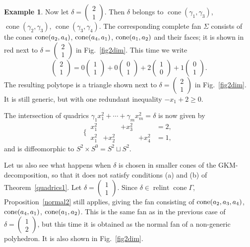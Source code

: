 \documentclass[a4paper]{amsart}
\theoremstyle{definition}
\newtheorem{example}[theorem]{Example}
\theoremstyle{remark}
\numberwithin{equation}{section}
\newcommand{\mb}[1]{{\textbf {\textit#1}}}
\renewcommand{\ge}{\geqslant}
\def\cone{\mathop{\mathrm{cone}}}
\def\relint{\mathop{\mathrm{relint}}}
\newcommand{\<}{\langle}
\renewcommand{\>}{\rangle}
\begin{document}
\begin{example}
Now let $\delta=\begin{pmatrix}2\\1\end{pmatrix}$. Then $\delta$ belongs to 
$\cone(\gamma_1,\gamma_3)$, $\cone(\gamma_2,\gamma_3)$, $\cone(\gamma_3,\gamma_4)$. The corresponding complete fan $\Sigma$ consists of the cones $\cone(\mb a_2,\mb a_4)$, $\cone(\mb a_4,\mb a_1)$, $\cone(\mb a_1,\mb a_2)$ and their faces; it is shown in red next to $\delta=\begin{pmatrix}2\\1\end{pmatrix}$ in Fig.~\ref{fig2dim}. This time we write
\[
  \begin{pmatrix}2\\1\end{pmatrix}=0\begin{pmatrix}1\\1\end{pmatrix}+
  0\begin{pmatrix}0\\1\end{pmatrix}+2\begin{pmatrix}1\\0\end{pmatrix}+
  1\begin{pmatrix}0\\1\end{pmatrix}.
\] 
The resulting polytope is a triangle shown next to $\delta=\begin{pmatrix}2\\1\end{pmatrix}$ in Fig.~\ref{fig2dim}. It is still generic, but with one redundant inequality $-x_1+2\ge0$.

The intersection of quadrics $\gamma_1x_1^2+\cdots+\gamma_mx_m^2=\delta$ is now given by
\[
  \biggl\{\,\begin{aligned}
  x_1^2&&+x_3^2&&=2,\\
  x_1^2&+x_2^2&&+x_4^2&=1,
  \end{aligned}
\]
and is diffeomorphic to $S^2\times S^0=S^2\sqcup S^2$. 

Let us also see what happens when $\delta$ is chosen in smaller cones of the GKM-decomposition, so that it does not satisfy conditions (a) and (b) of Theorem~\ref{quadrics1}. Let 
$\delta=\begin{pmatrix}1\\1\end{pmatrix}$. Since $\delta\in\relint\cone\Gamma$, Proposition~\ref{normal2} still applies, giving the fan consisting of $\cone(\mb a_2,\mb a_3,\mb a_4)$, $\cone(\mb a_4,\mb a_1)$, $\cone(\mb a_1,\mb a_2)$. This is the same fan as in the previous case of $\delta=\begin{pmatrix}1\\2\end{pmatrix}$, but this time it is obtained as the normal fan of a non-generic polyhedron. It is also shown in Fig.~\ref{fig2dim}.


\end{example}
\end{document}

